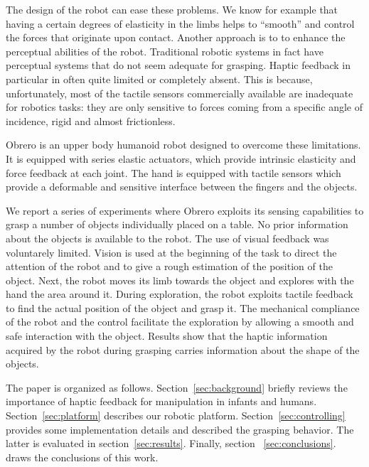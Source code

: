 The design of the robot can ease these problems. We know
for example that having a certain degrees of elasticity in the limbs helps to
``smooth''  and control the forces that originate upon contact.
Another approach is to to enhance the perceptual abilities of the robot.
Traditional robotic systems in fact have perceptual systems that do not seem
adequate for grasping. Haptic feedback in particular in often quite limited or
completely absent. This is because, unfortunately, most of the tactile
sensors commercially available are inadequate for robotics tasks: they are only
sensitive to forces coming from a specific angle of incidence, rigid
and almost frictionless.

Obrero\cite{obrero} is an upper body humanoid robot designed to
overcome these limitations. It is equipped with series elastic
actuators, which provide intrinsic elasticity and force feedback
at each joint. The hand is equipped with tactile sensors
\cite{etorresjSoft} which provide a deformable and sensitive
interface between the fingers and the objects.

We report a series of experiments where Obrero exploits its
sensing capabilities to grasp a number of objects individually
placed on a table. No prior information about the objects is
available to the robot. The use of visual feedback was voluntarely 
limited. Vision is used at the beginning of the task to direct 
the attention of the robot and to give a rough
estimation of the position of the object. Next, the robot moves
its limb towards the object and explores with the hand the area
around it. During exploration, the robot exploits tactile feedback
to find the actual position of the object and grasp it. The
mechanical compliance of the robot and the control facilitate the
exploration by allowing a smooth and safe interaction with the
object. Results show that the haptic information acquired by
the robot during grasping carries information about the shape of
the objects.

The paper is organized as follows. Section~\ref{sec:background}
briefly reviews the importance of haptic feedback 
for manipulation in infants and humans. Section~\ref{sec:platform}
describes our robotic platform. Section~\ref{sec:controlling} provides
some implementation details and described the grasping behavior. The latter
is evaluated in section~\ref{sec:results}. Finally, section ~\ref{sec:conclusions}.
draws the conclusions of this work.